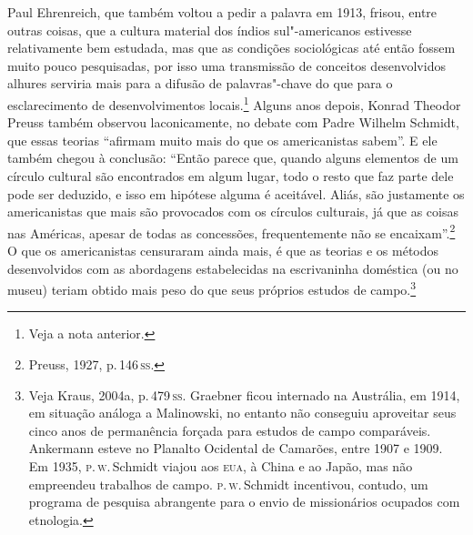 Paul Ehrenreich, que também voltou a pedir a palavra em 1913, frisou,
entre outras coisas, que a cultura material dos índios sul"-americanos
estivesse relativamente bem estudada, mas que as condições sociológicas
até então fossem muito pouco pesquisadas, por isso uma transmissão de
conceitos desenvolvidos alhures serviria mais para a difusão de
palavras"-chave do que para o esclarecimento de desenvolvimentos
locais.\footnote{Veja a nota anterior.} Alguns anos depois, Konrad
Theodor Preuss também observou laconicamente, no debate com Padre
Wilhelm Schmidt, que essas teorias ``afirmam muito mais do que os
americanistas sabem''. E ele também chegou à conclusão: ``Então parece
que, quando alguns elementos de um círculo cultural são encontrados em
algum lugar, todo o resto que faz parte dele pode ser deduzido, e isso
em hipótese alguma é aceitável. Aliás, são justamente os americanistas
que mais são provocados com os círculos culturais, já que as coisas nas
Américas, apesar de todas as concessões, frequentemente não se
encaixam''.\footnote{Preuss, 1927, p.\,146\,\textsc{ss}.} O que os americanistas censuraram
ainda mais, é que as teorias e os métodos desenvolvidos com as
abordagens estabelecidas na escrivaninha doméstica (ou no museu) teriam
obtido mais peso do que seus próprios estudos de campo.\footnote{Veja
  Kraus, 2004a, p.\,479\,\textsc{ss}. Graebner ficou internado na Austrália, em
  1914, em situação análoga a Malinowski, no entanto não conseguiu
  aproveitar seus cinco anos de permanência forçada para estudos de
  campo comparáveis. Ankermann esteve no Planalto Ocidental de Camarões,
  entre 1907 e 1909. Em 1935, \textsc{p}.\,\textsc{w}.\,Schmidt viajou aos \textsc{eua}, à China e ao
  Japão, mas não empreendeu trabalhos de campo. \textsc{p}.\,\textsc{w}.\,Schmidt
  incentivou, contudo, um programa de pesquisa abrangente para o envio
  de missionários ocupados com etnologia.}

